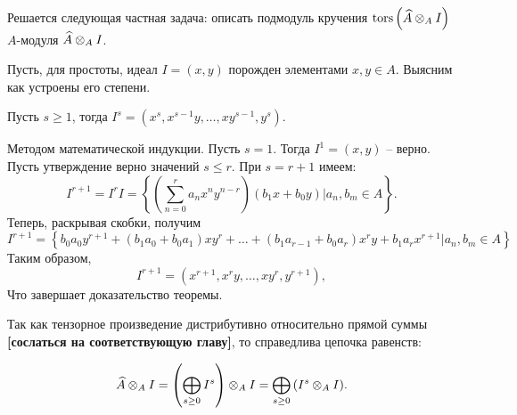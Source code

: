     Решается следующая частная задача: описать подмодуль кручения $\textup{tors}\left(\widehat{A} \otimes_A I\right)$ 
    $A$-модуля $\widehat{A} \otimes_A I$.

    Пусть, для простоты, идеал $I = (x, y)$ порожден элементами $x, y \in A$. Выясним как устроены
    его степени. 

    \begin{Theorem}
        Пусть $s \geq 1$, тогда $I^s = (x^s, x^{s-1}y, \dots, xy^{s-1}, y^s)$.
    \end{Theorem}
    \begin{Proof}
        Методом математической индукции. Пусть $s = 1$. Тогда $I^1 = (x, y)$ -- верно. Пусть утверждение
        верно значений $s \leq r$. При $s = r + 1$ имеем:
        \begin{equation*}
            I^{r + 1} = I^{r}I = \left\{\left(\sum_{n = 0}^{r} a_nx^ny^{n - r}\right)(b_1x + b_0y) 
            | a_n, b_m \in A\right\}.
        \end{equation*}
        Теперь, раскрывая скобки, получим
        \begin{equation*}
            I^{r + 1} = \left\{ b_0a_0y^{r + 1} + (b_1a_0 + b_0a_1)xy^{r} + \dots + 
                (b_1a_{r - 1} + b_0a_{r})x^ry + b_1a_rx^{r + 1} | a_n, b_m \in A \right\}
        \end{equation*}
        Таким образом,
        \begin{equation*}
            I^{r + 1} = (x^{r + 1}, x^ry, \dots, xy^r, y^{r + 1}),
        \end{equation*}
        Что завершает доказательство теоремы.
    \end{Proof}

    Так как тензорное произведение дистрибутивно относительно прямой суммы 
    \textbf{[сослаться на соответствующую главу]}, то справедлива цепочка равенств:

    \begin{equation*}
        \widehat{A} \otimes_A I = \left(\bigoplus_{s \geq 0}{I^s}\right) \otimes_A I = 
            \bigoplus_{s \geq 0}{\left(I^s \otimes_A I\right)}.
    \end{equation*}


